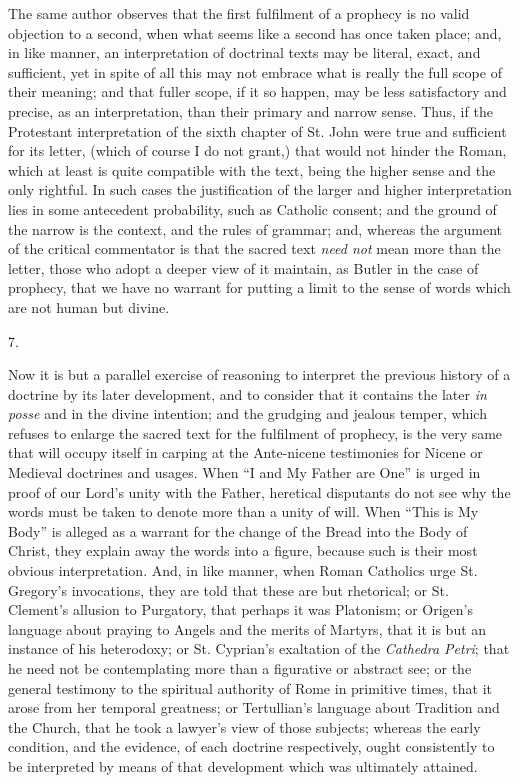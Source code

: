 The same author observes that the first fulfilment of
a prophecy is no valid objection to a second, when what
seems like a second has once taken place; and, in like
manner, an interpretation of doctrinal texts may be
literal, exact, and sufficient, yet in spite of all this
may not embrace what is really the full scope of their
meaning; and that fuller scope, if it so happen, may be
less satisfactory and precise, as an interpretation, than
their primary and narrow sense. Thus, if the Protestant
interpretation of the sixth chapter of St. John were true
and sufficient for its letter, (which of course I do not
grant,) that would not hinder the Roman, which at least
is quite compatible with the text, being the higher sense
and the only rightful. In such cases the justification of
the larger and higher interpretation lies in some
antecedent probability, such as Catholic consent; and the
ground of the narrow is the context, and the rules of
grammar; and, whereas the argument of the critical
commentator is that the sacred text \emph{ need not} mean more
than the letter, those who adopt a deeper view of it
maintain, as Butler in the case of prophecy, that we have
no warrant for putting a limit to the sense of words
which are not human but divine.

7.

Now it is but a parallel exercise of reasoning to
interpret the previous history of a doctrine by its later
development, and to consider that it contains the later \emph{in
posse} and in the divine intention; and the grudging
and jealous temper, which refuses to enlarge the sacred
text for the fulfilment of prophecy, is the very same
that will occupy itself in carping at the Ante-nicene
testimonies for Nicene or Medieval doctrines and usages.
When ``I and My Father are One'' is urged in
proof of our Lord's unity with the Father, heretical
disputants do not see why the words must be taken to
denote more than a unity of will. When ``This is My
Body'' is alleged as a warrant for the change of the
Bread into the Body of Christ, they explain away the
words into a figure, because such is their most obvious
interpretation. And, in like manner, when Roman Catholics
urge St. Gregory's invocations, they are told that these
are but rhetorical; or St. Clement's allusion to
Purgatory, that perhaps it was Platonism; or Origen's
language about praying to Angels and the merits of
Martyrs, that it is but an instance of his heterodoxy; or
St. Cyprian's exaltation of the \emph{Cathedra Petri};
that he need not be contemplating more than a figurative
or abstract see; or the general testimony to the
spiritual authority of Rome in primitive times, that it
arose from her temporal greatness; or Tertullian's
language about Tradition and the Church, that he took a
lawyer's view of those subjects; whereas the early
condition, and the evidence, of each doctrine
respectively, ought consistently to be interpreted by
means of that development which was ultimately attained.

